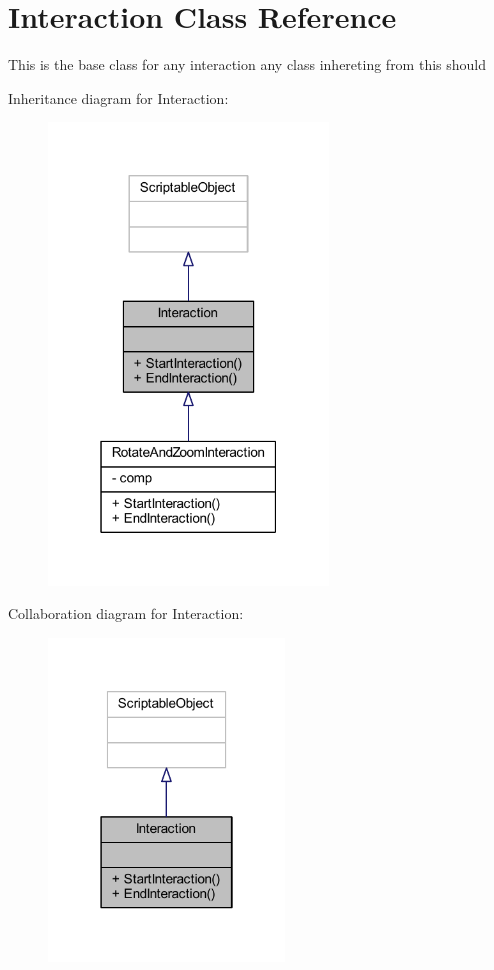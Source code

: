 \hypertarget{class_interaction}{}\section{Interaction Class Reference}
\label{class_interaction}


This is the base class for any interaction any class inhereting from this should  




Inheritance diagram for Interaction\+:
\nopagebreak
\begin{figure}[H]
\begin{center}
\leavevmode
\includegraphics[width=211pt]{class_interaction__inherit__graph}
\end{center}
\end{figure}


Collaboration diagram for Interaction\+:\nopagebreak
\begin{figure}[H]
\begin{center}
\leavevmode
\includegraphics[width=178pt]{class_interaction__coll__graph}
\end{center}
\end{figure}
